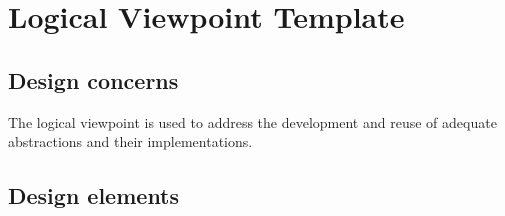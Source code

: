 \chapter{Logical Viewpoint Template} \label{chp:logical-viewpoint-template}

	
	\section{Design concerns} \label{s:logical-viewpoint-template:design-concerns}

		The logical viewpoint is used to address the development and reuse of adequate abstractions and their implementations.
	\section{Design elements} \label{s:logical-viewpoint-template:design-elements}

		
